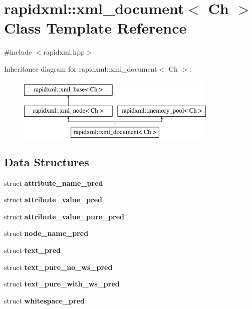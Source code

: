 \hypertarget{classrapidxml_1_1xml__document}{
\section{rapidxml::xml\_\-document$<$ Ch $>$ Class Template Reference}
\label{db/d68/classrapidxml_1_1xml__document}
}


{\ttfamily \#include $<$rapidxml.hpp$>$}

Inheritance diagram for rapidxml::xml\_\-document$<$ Ch $>$:\begin{figure}[H]
\begin{center}
\leavevmode
\includegraphics[height=3.000000cm]{db/d68/classrapidxml_1_1xml__document}
\end{center}
\end{figure}
\subsection*{Data Structures}
\begin{DoxyCompactItemize}
\item 
struct {\bfseries attribute\_\-name\_\-pred}
\item 
struct {\bfseries attribute\_\-value\_\-pred}
\item 
struct {\bfseries attribute\_\-value\_\-pure\_\-pred}
\item 
struct {\bfseries node\_\-name\_\-pred}
\item 
struct {\bfseries text\_\-pred}
\item 
struct {\bfseries text\_\-pure\_\-no\_\-ws\_\-pred}
\item 
struct {\bfseries text\_\-pure\_\-with\_\-ws\_\-pred}
\item 
struct {\bfseries whitespace\_\-pred}
\end{DoxyCompactItemize}

